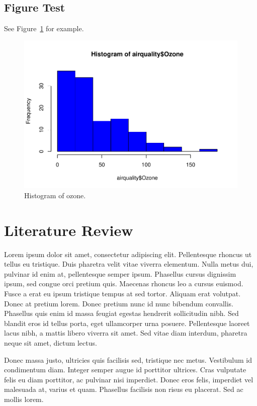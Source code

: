 \documentclass[fleqn,10pt]{JLA_article} %
\begin{document}
\hypertarget{figure-test}{%
\subsection{Figure Test}\label{figure-test}}

See Figure~\ref{fig:hist} for example.

\begin{figure}
\centering
\includegraphics{fig/hist-1.pdf}
\caption{\label{fig:hist}Histogram of ozone.}
\end{figure}

\hypertarget{literature-review}{%
\section{Literature Review}\label{literature-review}}

Lorem ipsum dolor sit amet, consectetur adipiscing elit. Pellentesque rhoncus ut tellus eu tristique. Duis pharetra velit vitae viverra elementum. Nulla metus dui, pulvinar id enim at, pellentesque semper ipsum. Phasellus cursus dignissim ipsum, sed congue orci pretium quis. Maecenas rhoncus leo a cursus euismod. Fusce a erat eu ipsum tristique tempus at sed tortor. Aliquam erat volutpat. Donec at pretium lorem. Donec pretium nunc id nunc bibendum convallis. Phasellus quis enim id massa feugiat egestas hendrerit sollicitudin nibh. Sed blandit eros id tellus porta, eget ullamcorper urna posuere. Pellentesque laoreet lacus nibh, a mattis libero viverra sit amet. Sed vitae diam interdum, pharetra neque sit amet, dictum lectus.

Donec massa justo, ultricies quis facilisis sed, tristique nec metus. Vestibulum id condimentum diam. Integer semper augue id porttitor ultrices. Cras vulputate felis eu diam porttitor, ac pulvinar nisi imperdiet. Donec eros felis, imperdiet vel malesuada at, varius et quam. Phasellus facilisis non risus eu placerat. Sed ac mollis lorem.
\end{document}
